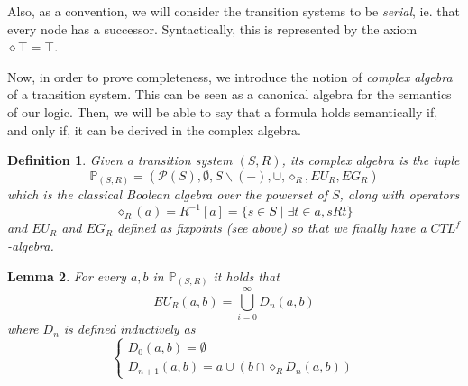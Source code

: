 \documentclass[11pt]{article}
\newtheorem{definition}{Definition}[section]
\newtheorem{lemma}[definition]{Lemma}
\begin{document}
Also, as a convention, we will consider the transition systems to be \emph{serial}, ie. that every node has a successor. Syntactically, this is represented by the axiom $\diamond\top = \top$.

Now, in order to prove completeness, we introduce the notion of \emph{complex algebra} of a transition system. This can be seen as a canonical algebra for the semantics of our logic. Then, we will be able to say that a formula holds semantically if, and only if, it can be derived in the complex algebra.

\begin{definition}\label{complex_algebra}
    Given a transition system $(S,R)$, its \emph{complex algebra} is the tuple \[\mathbb{P}_{(S,R)}=(\mathcal{P}(S),\emptyset,S\backslash(-),\cup,\diamond_R,EU_R,EG_R)\] which is the classical Boolean algebra over the powerset of $S$, along with operators \[\diamond_R(a)=R^{-1}[a]=\{s\in S \mid \exists t\in a, sRt \}\] and $EU_R$ and $EG_R$ defined as fixpoints (see above) so that we finally have a $CTL^f$-algebra. 
\end{definition}

\begin{lemma}\label{EU_as_union}
        For every $a,b$ in $\mathbb{P}_{(S,R)}$ it holds that \[EU_R(a,b)=\bigcup_{i=0}^{\infty}D_n(a,b)\] where $D_n$ is defined inductively as
        \begin{equation*}
            \begin{cases}
                D_0(a,b)=\emptyset\\
                D_{n+1}(a,b)=a\cup(b\cap\diamond_R D_n(a,b))
            \end{cases}
        \end{equation*}
        
\end{lemma}
\end{document}
